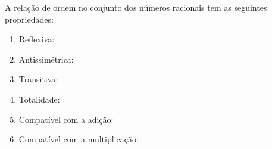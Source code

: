 \documentclass[../main.tex]{subfiles}
\begin{document}


\begin{prop}{A relação de ordem no conjunto dos números racionais tem as seguintes propriedades:}\label{rac-prop-relOrdem}
    \begin{enumerate}[label=(\roman*)]
        \item Reflexiva:
        \item Antissimétrica:
        \item Transitiva:
        \item Totalidade:
        \item Compatível com a adição:
        \item Compatível com a multiplicação:
    \end{enumerate}
\end{prop}
\end{document}
